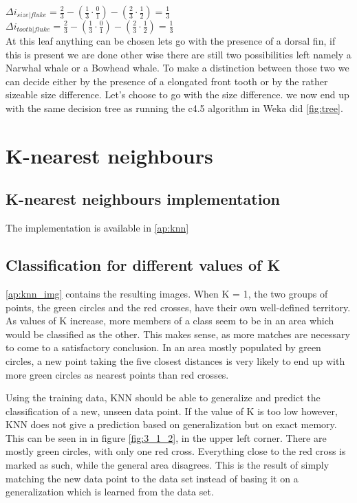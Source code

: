 \documentclass[10pt,a4paper]{article}
\begin{document}
$\Delta i_{size | fluke} = \frac{2}{3} - \left ( \frac{1}{3}  \cdot \frac{0}{1} \right ) - \left ( \frac{2}{3} \cdot \frac{1}{2}\right ) = \frac{1}{3}$\\
$\Delta i_{tooth | fluke} = \frac{2}{3} - \left ( \frac{1}{3}  \cdot \frac{0}{1} \right ) - \left ( \frac{2}{3} \cdot \frac{1}{2}\right ) = \frac{1}{3}$\\
At this leaf anything can be chosen lets go with the presence of a dorsal fin, if this is present we are done other wise there are still two possibilities left namely a Narwhal whale or a Bowhead whale. To make a distinction between those two we can decide either by the presence of a elongated front tooth or by the rather sizeable size difference. Let's choose to go with the size difference. we now end up with the same decision tree as running the c4.5 algorithm in Weka did \ref{fig:tree}.

\section{K-nearest neighbours}
\subsection{K-nearest neighbours implementation}
The implementation is available in \ref{ap:knn}

\subsection{Classification for different values of K} \label{ss:class}
\ref{ap:knn_img} contains the resulting images. When K = 1, the two groups of points, the green circles and the red crosses, have their own well-defined territory. As values of K increase, more members of a class seem to be in an area which would be classified as the other. This makes sense, as more matches are necessary to come to a satisfactory conclusion. In an area mostly populated by green circles, a new point taking the five closest distances is very likely to end up with more green circles as nearest points than red crosses.

Using the training data, KNN should be able to generalize and predict the classification of a new, unseen data point. If the value of K is too low however, KNN does not give a prediction based on generalization but on exact memory. This can be seen in in figure \ref{fig:3_1_2}, in the upper left corner. There are mostly green circles, with only one red cross. Everything close to the red cross is marked as such, while the general area disagrees. This is the result of simply matching the new data point to the data set instead of basing it on a generalization which is learned from the data set.
\end{document}
